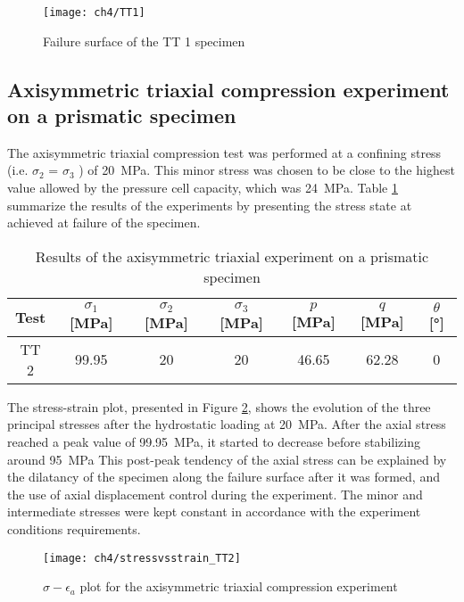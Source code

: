\begin{figure}[tb]
    \centering
    \texttt{[image: ch4/TT1]}
    \caption{Failure surface of the TT 1 specimen}
    \label{fig4:12}
\end{figure} 

\subsection{Axisymmetric triaxial compression experiment on a prismatic specimen}

The axisymmetric triaxial compression test was performed at a confining stress (i.e. $\sigma_2$ = $\sigma_3$ ) of \SI{20}{MPa}. This minor stress was chosen to be close to the highest value allowed by the pressure cell capacity, which was \SI{24}{MPa}. Table \ref{tb4:TT2} summarize the results of the experiments by presenting the stress state at achieved at failure of the specimen. 

\begin{table}
    \centering
    \begin{tabular}{ccccccc}
        \hline
        Test & $\sigma_1$ [\si{MPa}] & $\sigma_2$ [\si{MPa}] & $\sigma_3$ [\si{MPa}] & $p$ [\si{MPa}] & $q$ [\si{MPa}] & $\theta$ [\si{\degree}] \\
        \hline
        \hline
        TT 2 & 99.95 & 20 & 20 & 46.65 & 62.28 & 0\\
        \hline
    \end{tabular}
    \caption{Results of the axisymmetric triaxial experiment on a prismatic specimen}
    \label{tb4:TT2}
\end{table}

The stress-strain plot, presented in Figure \ref{fig4:13}, shows the evolution of the three principal stresses after the hydrostatic loading at \SI{20}{MPa}. After the axial stress reached a peak value of \SI{99.95}{MPa}, it started to decrease before stabilizing around \SI{95}{MPa} This post-peak tendency of the axial stress can be explained by the dilatancy of the specimen along the failure surface after it was formed, and the use of axial displacement control during the experiment. The minor and intermediate stresses were kept constant in accordance with the experiment conditions requirements.

\begin{figure}[tb]
    \centering
    \texttt{[image: ch4/stressvsstrain\_TT2]}
    \caption{$\sigma - \epsilon_a$ plot for the axisymmetric triaxial compression experiment}
    \label{fig4:13}
\end{figure} 

